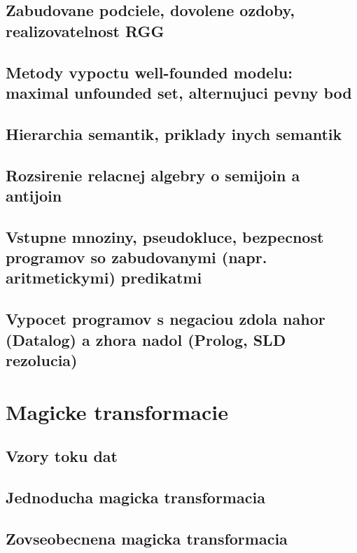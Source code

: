 \documentclass[12pt,a4paper]{article}
\begin{document}
\subsection{Zabudovane podciele, dovolene ozdoby, realizovatelnost RGG}

\subsection{Metody vypoctu well-founded modelu: maximal unfounded set, alternujuci pevny bod}

\subsection{Hierarchia semantik, priklady inych semantik}

\subsection{Rozsirenie relacnej algebry o semijoin a antijoin}

\subsection{Vstupne mnoziny, pseudokluce, bezpecnost programov so zabudovanymi (napr. aritmetickymi) predikatmi}

\subsection{Vypocet programov s negaciou zdola nahor (Datalog) a zhora nadol (Prolog, SLD rezolucia)}

\section{Magicke transformacie}

\subsection{Vzory toku dat}

\subsection{Jednoducha magicka transformacia}

\subsection{Zovseobecnena magicka transformacia}
\end{document}
